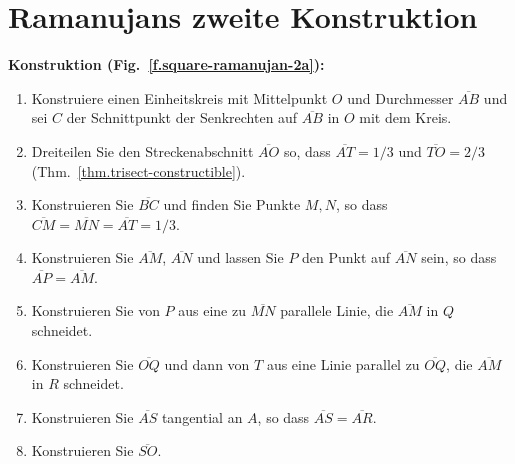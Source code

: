 
\section{Ramanujans zweite Konstruktion}\label{s.square-ramanujan-second}

\textbf{Konstruktion  (Fig.~\ref{f.square-ramanujan-2a}):}
\begin{enumerate}

\item Konstruiere einen Einheitskreis mit Mittelpunkt $O$ und Durchmesser $\overline{AB}$ und sei $C$ der Schnittpunkt der Senkrechten auf $\overline{AB}$ in $O$ mit dem Kreis.

\item Dreiteilen Sie den Streckenabschnitt $\overline{AO}$ so, dass $\overline{AT}=1/3$ und $\overline{TO}=2/3$ (Thm.~\ref{thm.trisect-constructible}).

\item Konstruieren Sie $\overline{BC}$ und finden Sie Punkte $M,N$, so dass $\overline{CM}=\overline{MN}=\overline{AT}=1/3$.

\item Konstruieren Sie $\overline{AM}$, $\overline{AN}$ und lassen Sie $P$ den Punkt auf $\overline{AN}$ sein, so dass $\overline{AP}=\overline{AM}$.

\item Konstruieren Sie von $P$ aus eine zu $\overline{MN}$ parallele Linie, die $\overline{AM}$ in $Q$ schneidet.

\item Konstruieren Sie $\overline{OQ}$ und dann von $T$ aus eine Linie parallel zu $\overline{OQ}$, die $\overline{AM}$ in $R$ schneidet.

\item Konstruieren Sie $\overline{AS}$ tangential an $A$, so dass $\overline{AS}=\overline{AR}$.

\item Konstruieren Sie $\overline{SO}$.
\end{enumerate}

